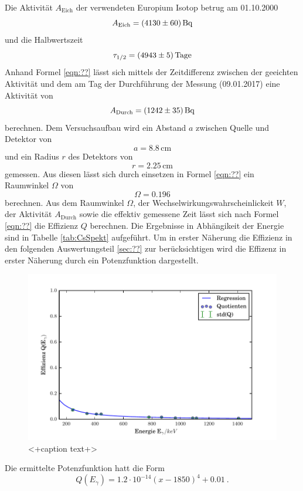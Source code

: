 Die Aktivität $A_\text{Eich}$ der verwendeten Europium Isotop betrug am 01.10.2000
\begin{equation}
  A_\text{Eich} = (\num{4130 +- 60}) \, \text{Bq} 
  \label{eqn:AktEu}
\end{equation}
und die Halbwertszeit
\begin{equation}
  \tau_{1/2} = (\num{4943 +- 5}) \, \text{Tage} 
  \label{eqn:halb}
\end{equation}
Anhand Formel \ref{eqn:??} lässt sich mittels der Zeitdifferenz zwischen der geeichten Aktivität und dem am Tag der Durchführung der Messung (09.01.2017) eine Aktivität von 
\begin{equation}
  A_\text{Durch} = (\num{1242 +- 35}) \, \text{Bq}
  \label{eqn:AktEEu}
\end{equation}
berechnen. Dem Versuchsaufbau wird ein Abstand $a$ zwischen Quelle und Detektor von 
\begin{equation}
  a = 8.8 \, \text{cm}
  \label{<++>}
\end{equation}
und ein Radius $r$ des Detektors von
\begin{equation}
  r = 2.25 \, \text{cm} 
  \label{<++>}
\end{equation}
gemessen. Aus diesen lässt sich durch einsetzen in Formel \ref{eqn:??} ein Raumwinkel $\Omega$ von 
\begin{equation}
  \Omega = 0.196 
  \label{eqn:Raum}
\end{equation}
berechnen. Aus dem Raumwinkel $\Omega$, der Wechselwirkungswahrscheinlickeit $W$, der Aktivität $A_\text{Durch}$ sowie die effektiv gemessene Zeit lässt sich nach Formel \ref{eqn:??} die Effizienz $Q$ berechnen. Die Ergebnisse in Abhängikeit der Energie sind in Tabelle \ref{tab:CsSpekt} aufgeführt. Um in erster Näherung die Effizienz in den folgenden Auswertungsteil \ref{sec:??} zur berücksichtigen wird die Effizenz in erster Näherung durch ein Potenzfunktion dargestellt. 
\begin{figure}
  \centering
  \includegraphics[width=\textwidth]{./build/Effizienz.pdf}
  \caption{<+caption text+>}
  \label{fig:<+label+>}
\end{figure}
Die ermittelte Potenzfunktion hatt die Form 
\begin{equation}
  Q(E_\gamma)= 1.2 \cdot 10^{-14} \left( x - 1850 \right)^4 + 0.01 \ .
  \label{eqn:QCs}
\end{equation}
